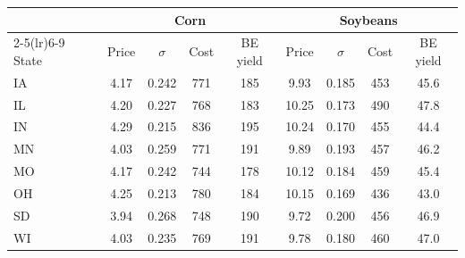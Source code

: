 \begin{tabular}{lcccccccc}
\toprule
& \multicolumn{4}{c}{Corn} & \multicolumn{4}{c}{Soybeans}\\
\cmidrule(lr){2-5}\cmidrule(lr){6-9}
State & Price & $\sigma$ & Cost & BE yield & Price & $\sigma$ & Cost & BE yield\\
\midrule
IA & 4.17 & 0.242 & 771 & 185 & 9.93 & 0.185 & 453 & 45.6 \\
IL & 4.20 & 0.227 & 768 & 183 & 10.25 & 0.173 & 490 & 47.8 \\
IN & 4.29 & 0.215 & 836 & 195 & 10.24 & 0.170 & 455 & 44.4 \\
MN & 4.03 & 0.259 & 771 & 191 & 9.89 & 0.193 & 457 & 46.2 \\
MO & 4.17 & 0.242 & 744 & 178 & 10.12 & 0.184 & 459 & 45.4 \\
OH & 4.25 & 0.213 & 780 & 184 & 10.15 & 0.169 & 436 & 43.0 \\
SD & 3.94 & 0.268 & 748 & 190 & 9.72 & 0.200 & 456 & 46.9 \\
WI & 4.03 & 0.235 & 769 & 191 & 9.78 & 0.180 & 460 & 47.0 \\
\bottomrule
\end{tabular}
